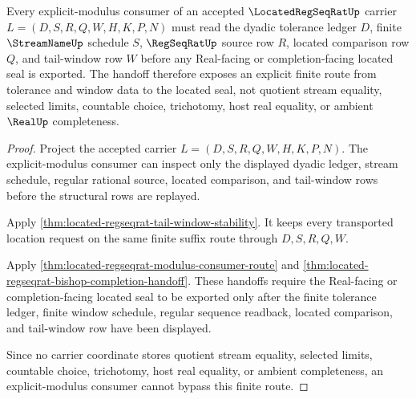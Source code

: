 \begin{theorem}
\label{thm:located-regseqrat-explicit-modulus-handoff}
Every explicit-modulus consumer of an accepted $\LocatedRegSeqRatUp$ carrier $L=(D,S,R,Q,W,H,K,P,N)$ must read the dyadic tolerance ledger $D$, finite $\StreamNameUp$ schedule $S$, $\RegSeqRatUp$ source row $R$, located comparison row $Q$, and tail-window row $W$ before any Real-facing or completion-facing located seal is exported. The handoff therefore exposes an explicit finite route from tolerance and window data to the located seal, not quotient stream equality, selected limits, countable choice, trichotomy, host real equality, or ambient $\RealUp$ completeness.
\end{theorem}
\begin{proof}
Project the accepted carrier $L=(D,S,R,Q,W,H,K,P,N)$. The explicit-modulus consumer can inspect only the displayed dyadic ledger, stream schedule, regular rational source, located comparison, and tail-window rows before the structural rows are replayed.

Apply \autoref{thm:located-regseqrat-tail-window-stability}. It keeps every transported location request on the same finite suffix route through $D,S,R,Q,W$.

Apply \autoref{thm:located-regseqrat-modulus-consumer-route} and \autoref{thm:located-regseqrat-bishop-completion-handoff}. These handoffs require the Real-facing or completion-facing located seal to be exported only after the finite tolerance ledger, finite window schedule, regular sequence readback, located comparison, and tail-window row have been displayed.

Since no carrier coordinate stores quotient stream equality, selected limits, countable choice, trichotomy, host real equality, or ambient completeness, an explicit-modulus consumer cannot bypass this finite route.
\end{proof}

